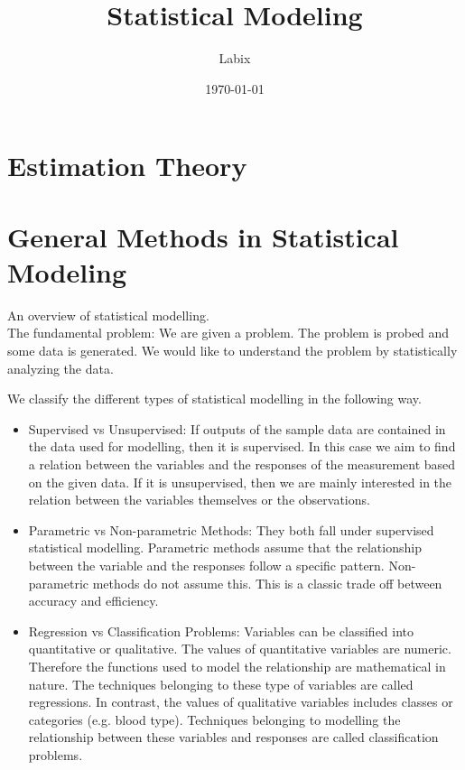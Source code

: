 \documentclass[a4paper]{article}
\title{Statistical Modeling}
\author{Labix}
\date{\today}
\begin{document}
\maketitle
\tableofcontents
\pagebreak

\section{Estimation Theory}


\pagebreak
\section{General Methods in Statistical Modeling}
An overview of statistical modelling. \\

The fundamental problem: We are given a problem. The problem is probed and some data is generated. We would like to understand the problem by statistically analyzing the data. 

We classify the different types of statistical modelling in the following way. 
\begin{itemize}
\item Supervised vs Unsupervised: If outputs of the sample data are contained in the data used for modelling, then it is supervised. In this case we aim to find a relation between the variables and the responses of the measurement based on the given data. If it is unsupervised, then we are mainly interested in the relation between the variables themselves or the observations. 
\item Parametric vs Non-parametric Methods: They both fall under supervised statistical modelling. Parametric methods assume that the relationship between the variable and the responses follow a specific pattern. Non-parametric methods do not assume this. This is a classic trade off between accuracy and efficiency. 
\item Regression vs Classification Problems: Variables can be classified into quantitative or qualitative. The values of quantitative variables are numeric. Therefore the functions used to model the relationship are mathematical in nature. The techniques belonging to these type of variables are called regressions. In contrast, the values of qualitative variables includes classes or categories (e.g. blood type). Techniques belonging to modelling the relationship between these variables and responses are called classification problems. 
\end{itemize}
\end{document}
